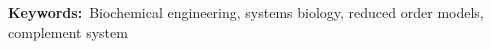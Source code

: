 \documentclass[12pt]{article}
\begin{document}
\vspace{0.1in}
{\noindent \textbf{Keywords:}~Biochemical engineering, systems biology, reduced order models, complement system}



\pagebreak

\setcounter{page}{1}

\linenumbers
\end{document}
